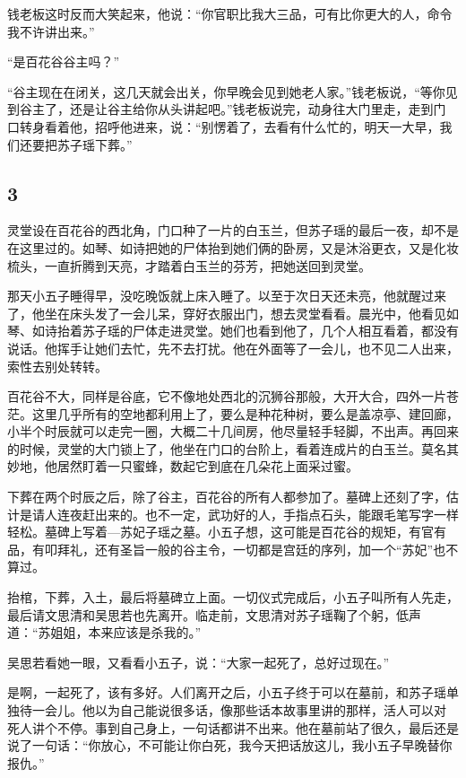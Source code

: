 钱老板这时反而大笑起来，他说：“你官职比我大三品，可有比你更大的人，命令我不许讲出来。”

“是百花谷谷主吗？”

“谷主现在在闭关，这几天就会出关，你早晚会见到她老人家。”钱老板说，“等你见到谷主了，还是让谷主给你从头讲起吧。”钱老板说完，动身往大门里走，走到门
口转身看着他，招呼他进来，说：“别愣着了，去看有什么忙的，明天一大早，我们还要把苏子瑶下葬。”
\newline

{\centering\subsection{3}}

灵堂设在百花谷的西北角，门口种了一片的白玉兰，但苏子瑶的最后一夜，却不是在这里过的。如琴、如诗把她的尸体抬到她们俩的卧房，又是沐浴更衣，又是化妆梳头，一直折腾到天亮，才踏着白玉兰的芬芳，把她送回到灵堂。

那天小五子睡得早，没吃晚饭就上床入睡了。以至于次日天还未亮，他就醒过来了，他坐在床头发了一会儿呆，穿好衣服出门，想去灵堂看看。晨光中，他看见如琴、如诗抬着苏子瑶的尸体走进灵堂。她们也看到他了，几个人相互看着，都没有说话。他挥手让她们去忙，先不去打扰。他在外面等了一会儿，也不见二人出来，索性去别处转转。

百花谷不大，同样是谷底，它不像地处西北的沉狮谷那般，大开大合，四外一片苍茫。这里几乎所有的空地都利用上了，要么是种花种树，要么是盖凉亭、建回廊，小半个时辰就可以走完一圈，大概二十几间房，他尽量轻手轻脚，不出声。再回来的时候，灵堂的大门锁上了，他坐在门口的台阶上，看着连成片的白玉兰。莫名其妙地，他居然盯着一只蜜蜂，数起它到底在几朵花上面采过蜜。

下葬在两个时辰之后，除了谷主，百花谷的所有人都参加了。墓碑上还刻了字，估计是请人连夜赶出来的。也不一定，武功好的人，手指点石头，能跟毛笔写字一样轻松。墓碑上写着—苏妃子瑶之墓。小五子想，这可能是百花谷的规矩，有官有品，有叩拜礼，还有圣旨一般的谷主令，一切都是宫廷的序列，加一个“苏妃”也不算过。

抬棺，下葬，入土，最后将墓碑立上面。一切仪式完成后，小五子叫所有人先走，最后请文思清和吴思若也先离开。临走前，文思清对苏子瑶鞠了个躬，低声道：“苏姐姐，本来应该是杀我的。”

吴思若看她一眼，又看看小五子，说：“大家一起死了，总好过现在。”

是啊，一起死了，该有多好。人们离开之后，小五子终于可以在墓前，和苏子瑶单独待一会儿。他以为自己能说很多话，像那些话本故事里讲的那样，活人可以对
死人讲个不停。事到自己身上，一句话都讲不出来。他在墓前站了很久，最后还是说了一句话：“你放心，不可能让你白死，我今天把话放这儿，我小五子早晚替你报仇。”

